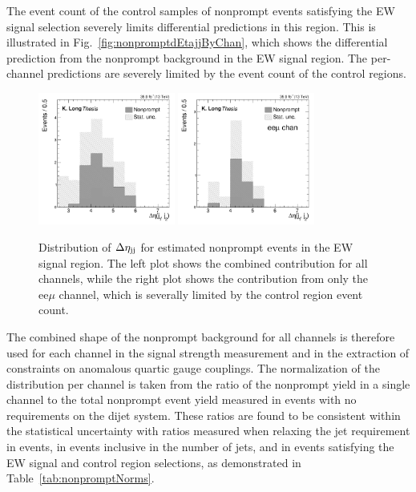 The event count of the control samples of nonprompt events
satisfying the EW signal selection severely limits
differential predictions in this region. This is illustrated in 
Fig.~\ref{fig:nonpromptdEtajjByChan}, which shows the differential
prediction from the nonprompt background in the EW signal region.
The per-channel predictions are severely limited by the event count
of the control regions.

\begin{figure}[htbp]
  \centering
   \includegraphics[width=0.4\textwidth]{figures/AnalysisProcedure/dEtajj_nonprompt.pdf}
   \includegraphics[width=0.4\textwidth]{figures/AnalysisProcedure/dEtajj_nonprompt_eem.pdf}
  \caption{
    Distribution of $\Delta\eta_{\mathrm{jj}}$ for estimated nonprompt events in the EW signal region. The
    left plot shows the combined contribution for all channels, while the right plot shows
    the contribution from only the ee$\mu$ channel, which is severally limited by the 
    control region event count. 
        }
 \label{fig:fakeRates2D}
\end{figure}

The combined shape of the nonprompt background for all channels 
is therefore used for each channel in the \EWWZ signal strength
measurement and in the extraction of constraints on anomalous quartic
gauge couplings. 
The normalization of the distribution per channel is taken from the 
ratio of the nonprompt yield in a single channel to the total nonprompt event yield 
measured in \WZjj events with no requirements on the dijet system.
These ratios are found to be consistent within the statistical uncertainty with ratios measured
when relaxing the jet \PT requirement in \WZjj events, in \WZ events inclusive in the number of jets, 
and in events satisfying the EW signal and control region selections, as demonstrated in
Table~\ref{tab:nonpromptNorms}.


